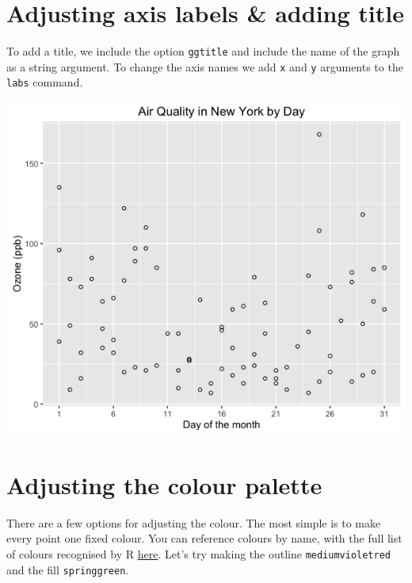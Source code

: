 \section{Adjusting axis labels \& adding
title}\label{adjusting-axis-labels-adding-title-3}

To add a title, we include the option \texttt{ggtitle} and include the
name of the graph as a string argument. To change the axis names we add
\texttt{x} and \texttt{y} arguments to the \texttt{labs} command.

\begin{Shaded}
\begin{Highlighting}[]
\StringTok{ }\StringTok{ }\NormalTok{(}\NormalTok{) +}\StringTok{ }
\StringTok{      }\NormalTok{(} \NormalTok{, } \NormalTok{) }
\end{Highlighting}
\end{Shaded}

\begin{center}\includegraphics[width=0.55\linewidth]{0_all_posts_pdf/scatter_4-1} \end{center}

\section{Adjusting the colour
palette}\label{adjusting-the-colour-palette}

There are a few options for adjusting the colour. The most simple is to
make every point one fixed colour. You can reference colours by name,
with the full list of colours recognised by R
\href{http://www.stat.columbia.edu/~tzheng/files/Rcolor.pdf}{here}.
Let's try making the outline \texttt{mediumvioletred} and the fill
\texttt{springgreen}.

